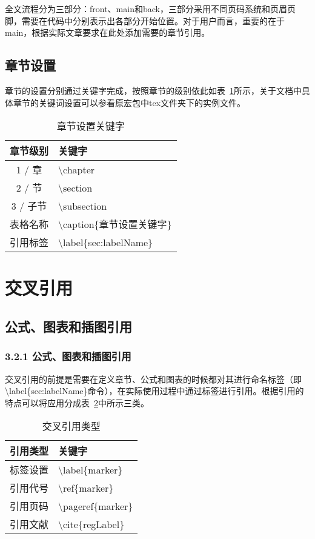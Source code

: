 全文流程分为三部分：front、main和back，三部分采用不同页码系统和页眉页脚，需要在代码中分别表示出各部分开始位置。对于用户而言，重要的在于main，根据实际文章要求在此处添加需要的章节引用。

\subsection{章节设置}
章节的设置分别通过关键字完成，按照章节的级别依此如表~\ref{tab:setSection}所示，关于文档中具体章节的关键词设置可以参看原宏包中tex文件夹下的实例文件。


\begin{table}[htb]
 \centering
  \caption{章节设置关键字}     %
  \label{tab:setSection}    %
  \begin{tabular}{cl}
    \hline
    章节级别        & 关键字     \\
    \hline
    1 / 章        & \textbackslash chapter \\
    2 / 节        & \textbackslash section \\
    3 / 子节      & \textbackslash  subsection \\
    表格名称       & \textbackslash caption\{章节设置关键字\} \\
    引用标签       & \textbackslash label\{sec:labelName\} \\
    \hline
  \end{tabular}
\end{table}


\section{交叉引用}
\subsection{公式、图表和插图引用}
\subsubsection{3.2.1 公式、图表和插图引用}
\label{sec:refofFigAndTab}
交叉引用的前提是需要在定义章节、公式和图表的时候都对其进行命名标签（即\textbackslash label\{sec:labelName\}命令），在实际使用过程中通过标签进行引用。根据引用的特点可以将应用分成表~\ref{tab:citeType}中所示三类。

\begin{table}[htb]
 \centering
  \caption{交叉引用类型}       %
  \label{tab:citeType}    %
  \begin{tabular}{cl}
    \hline
    引用类型     & 关键字     \\
    \hline
    标签设置        & \textbackslash label\{marker\}  \\
    引用代号        & \textbackslash ref\{marker\}    \\
    引用页码        & \textbackslash pageref\{marker\} \\
    引用文献        & \textbackslash cite\{regLabel\} \\
    \hline
  \end{tabular}
\end{table}

